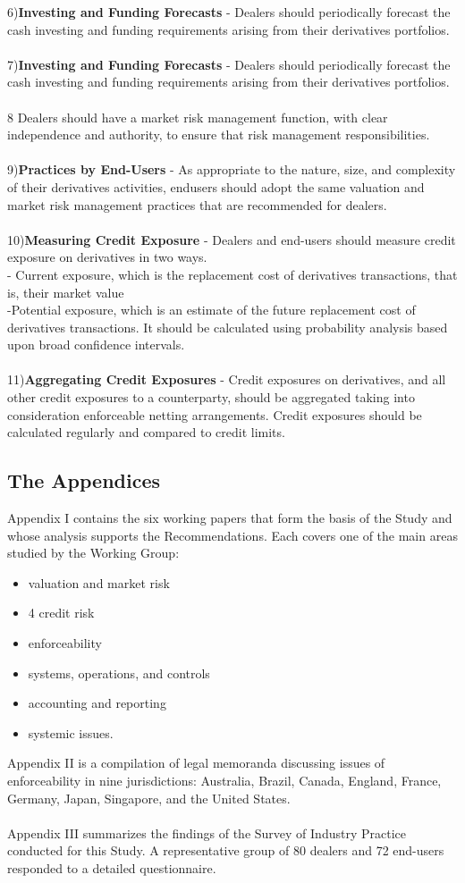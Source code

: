\documentclass[12pt, a4paper]{report}
\begin{document}
6)\textbf{Investing and Funding Forecasts} - Dealers should
periodically forecast the cash investing and funding requirements
arising from their derivatives portfolios.
\\\\
7)\textbf{Investing and Funding Forecasts} - Dealers should
periodically forecast the cash investing and funding requirements
arising from their derivatives portfolios.
\\\\
8  Dealers should have a market risk management function, with
clear independence and authority, to ensure that risk management
responsibilities.
\\\\
9)\textbf{Practices by End-Users} - As appropriate to the nature,
size, and complexity of their derivatives activities, endusers
should adopt the same valuation and market risk management
practices that are recommended for dealers.
\\\\
10)\textbf{Measuring Credit Exposure} - Dealers and end-users
should measure credit exposure on derivatives in two ways.\\-
Current exposure, which is the replacement cost of derivatives
transactions, that is, their market value\\-Potential exposure,
which is an estimate of the future replacement cost of derivatives
transactions. It should be calculated using probability analysis
based upon broad confidence intervals.
\\\\
11)\textbf{Aggregating Credit Exposures} -  Credit exposures on
derivatives, and all other credit exposures to a counterparty,
should be aggregated taking into consideration enforceable netting
arrangements. Credit exposures should be calculated regularly and
compared to credit limits.

\subsection{The Appendices} Appendix I contains the six working
papers that form the basis of the Study and whose analysis
supports the Recommendations. Each covers one of the main areas
studied by the Working Group:
\begin{itemize}
\item valuation and market risk\item 4 credit risk \item
enforceability \item systems, operations, and controls \item
accounting and reporting \item systemic issues.
\end{itemize}
Appendix II is a compilation of legal memoranda discussing issues
of enforceability in nine jurisdictions: Australia, Brazil,
Canada, England, France, Germany, Japan, Singapore, and the United
States.
\\\\Appendix III summarizes the findings of the Survey of Industry
Practice conducted for this Study. A representative group of 80
dealers and 72 end-users responded to a detailed questionnaire.
\end{document}
